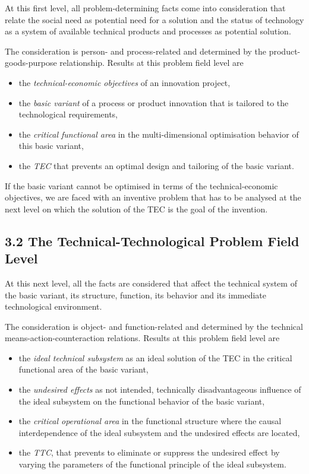 \documentclass[12pt,a4paper]{article}
\begin{document}
At this first level, all problem-determining facts come into consideration
that relate the social need as potential need for a solution and the status of
technology as a system of available technical products and processes as
potential solution.

The consideration is person- and process-related and determined by the
product-goods-purpose relationship.  Results at this problem field level are
\begin{itemize}
\item the \emph{technical-economic objectives} of an innovation project,
\item the \emph{basic variant} of a process or product innovation that is
  tailored to the technological requirements,
\item the \emph{critical functional area} in the multi-dimensional
  optimisation behavior of this basic variant,
\item the \emph{TEC} that prevents an optimal design and tailoring of the
  basic variant.
\end{itemize}

If the basic variant cannot be optimised in terms of the technical-economic
objectives, we are faced with an inventive problem that has to be analysed at
the next level on which the solution of the TEC is the goal of the invention.

\subsection*{3.2 The Technical-Technological Problem Field Level}

At this next level, all the facts are considered that affect the technical
system of the basic variant, its structure, function, its behavior and its
immediate technological environment.

The consideration is object- and function-related and determined by the
technical means-action-counteraction relations.  Results at this problem field
level are
\begin{itemize}
\item the \emph{ideal technical subsystem} as an ideal solution of the TEC in
  the critical functional area of the basic variant,
\item the \emph{undesired effects} as not intended, technically
  disadvantageous influence of the ideal subsystem on the functional behavior
  of the basic variant,
\item the \emph{critical operational area} in the functional structure where
  the causal interdependence of the ideal subsystem and the undesired effects
  are located,
\item the \emph{TTC}, that prevents to eliminate or suppress the undesired
  effect by varying the parameters of the functional principle of the ideal
  subsystem.
\end{itemize}
\end{document}
